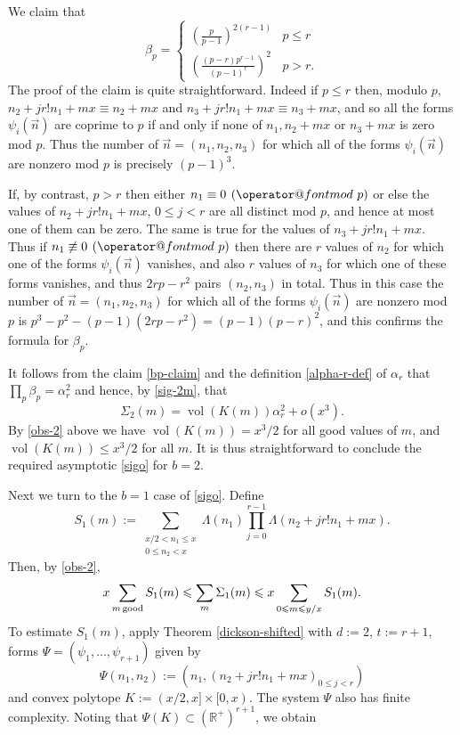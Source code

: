 \documentclass[11pt]{amsart}
\makeatletter
\numberwithin{equation}{section}  %
\theoremstyle{remark}
\theoremstyle{plain}
\numberwithin{equation}{section}
\newcommand{\R}{\mathbb{R}}
\renewcommand{\pmod}[1]{\allowbreak\mkern7mu({\operator@font mod}\,\,#1)}
\renewcommand{\le}{\leqslant}
\renewcommand{\leq}{\leqslant}
\renewcommand{\(}{\left(}
\renewcommand{\)}{\right)}
\newcommand{\pfrac}[2]{\left(\frac{#1}{#2}\right)}  %
\newcommand{\vect}[1]{{\ensuremath{\vec{#1}}}}
\newcommand{\vol}{\operatorname{vol}}
\makeatother
\begin{document}
We claim that
\begin{equation}\label{bp-claim} \beta_p = \left\{ \begin{array}{ll} (\frac{p}{p-1})^{2(r - 1)} & p \leq r \\ \pfrac{(p-r)p^{r-1}}{(p-1)^r}^2 & p > r.\end{array}  \right. \end{equation}
The proof of the claim is quite straightforward. Indeed if $p \leq r$ then, modulo $p$, $n_2 + jr! n_1 + mx \equiv n_2 + mx$ and $n_3 + jr! n_1 + mx \equiv n_3 + mx$, and so all the forms $\psi_i(\vect{n})$ are coprime to $p$ if and only if none of $n_1,n_
2 + mx$ or $n_3 + mx$ is zero mod $p$. Thus the number of $\vect{n} = (n_1, n_2,n_3)$ for which all of the forms $\psi_i(\vect{n})$ are nonzero mod $p$ is precisely $(p-1)^3$.

If, by contrast, $p > r$ then either $n_1 \equiv 0 \pmod{p}$ or else the values of $n_2+ jr! n_1 + mx$, $0 \leq j < r$ are all distinct mod $p$, and hence at most one of them can be zero. The same is true for the values of $n_3 + jr! n_1 + mx$. Thus if $n_
1 \not\equiv 0 \pmod{p}$ then there are $r$ values of $n_2$ for which one of the forms $\psi_i(\vect{n})$ vanishes, and also $r$ values of $n_3$ for which one of these forms vanishes, and thus $2rp - r^2$ pairs $(n_2,n_3)$ in total. Thus in this case the number of $\vect{n} = (n_1, n_2,n_3)$ for which all of the forms $\psi_i(\vect{n})$ are nonzero mod $p$ is $p^3 - p^2 - (p-1)(2rp - r^2) = (p-1)(p-r)^2$, and this confirms the formula for $\beta_p$.

It follows from the claim \eqref{bp-claim} and the definition \eqref{alpha-r-def} of $\alpha_r$ that $\prod_p \beta_p = \alpha_r^2$ and hence, by \eqref{sig-2m}, that
\[ \Sigma_2(m) = \vol(K(m)) \alpha_r^2 + o(x^3).\]
By \eqref{obs-2} above we have $\vol(K(m)) = x^3/2$ for all good values of $m$, and $\vol(K(m)) \leq x^3/2$ for all $m$. It is thus straightforward to conclude the required asymptotic \eqref{sigo} for $b=2$.

Next we turn to the $b=1$ case of \eqref{sigo}. Define
\[ S_1(m) := \sum_{\substack{x/2 < n_1 \le x \\ 0 \leq n_2 < x}}\Lambda(n_1) \prod_{j = 0}^{r-1} \Lambda(n_2 + jr! n_1 + mx).\] Then, by \eqref{obs-2},
\begin{equation}\label{sigma2-s2} x \sum_{m\, \mbox{\scriptsize good}} S_1(m) \leq \sum_m \Sigma_1(m) \leq x\sum_{0 \leq m \leq y/x} S_1(m).\end{equation}
 To estimate $S_1(m)$, apply Theorem \ref{dickson-shifted} with $d := 2$, $t := r+1$, forms $\Psi = (\psi_1,\dots, \psi_{r+1})$ given by
\[ \Psi(n_1,n_2) := (n_1,(n_2 + jr! n_1 + mx)_{0 \leq j < r})\] and convex polytope $K := (x/2, x] \times [0,x)$. The system $\Psi$ also has finite complexity. Noting that $\Psi( K) \subset (\R^{+})^{r+1}$, we obtain
\end{document}
